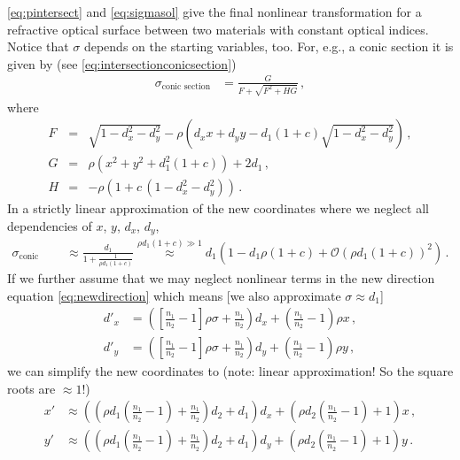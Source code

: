 \documentclass[12pt,a4paper,twoside,openright,BCOR10mm,headsepline,titlepage,abstracton,chapterprefix,final]{scrreprt}
\begin{document}
\eqref{eq:pintersect} and \eqref{eq:sigmasol} give the final nonlinear transformation for a refractive optical surface between
two materials with constant optical indices. Notice that $\sigma$ depends on the starting variables, too.  
For, e.g., a conic section it is given by (see \eqref{eq:intersectionconicsection})
\begin{align}
 \sigma_{\text{conic section}} &= \frac{G}{ F + \sqrt{F^2 + H G} }\,,
\end{align}
where
\begin{eqnarray}
   F &=& \sqrt{1 - d_x^2 - d_y^2} - \rho \left( d_x x + d_y y - d_1 (1+c) \sqrt{1 - d_x^2 - d_y^2} \right)\,, \\
   G &=& \rho (x^2 + y^2 + d_1^2 (1+c)) + 2 d_1\,, \\
   H &=& - \rho ( 1 + c \, (1 - d_x^2 - d_y^2) )\,.
\end{eqnarray}
In a strictly linear approximation of the new coordinates where we neglect all dependencies of $x$, $y$, $d_x$, $d_y$,
\begin{align}
 \sigma_\text{conic section} &\approx \frac{d_1}{1+ \frac{1}{\rho d_1 (1 + c)}} \stackrel{\rho d_1 (1+c)\gg 1}{\approx} d_1 \left(1 - d_1 \rho(1+c) + \mathcal{O}(\rho d_1 (1+c))^2\right)\,. 
\end{align}
If we further assume that we may neglect nonlinear terms in the new direction equation \eqref{eq:newdirection}
which means [we also approximate $\sigma \approx d_1$]\\
\begin{subequations}
 \begin{align}
  {d'}_x &= {\left(\left[\frac{n_{1}}{n_{2}} - 1\right]\rho \sigma + \frac{n_{1}}{n_{2}}\right)} d_{x} + {\left(\frac{n_{1}}{n_{2}} - 1\right)} \rho x\,,\\
  {d'}_y &= {\left(\left[\frac{n_{1}}{n_{2}} - 1\right]\rho \sigma + \frac{n_{1}}{n_{2}}\right)} d_{y} + {\left(\frac{n_{1}}{n_{2}} - 1\right)} \rho y\,,
 \end{align}
\end{subequations}
we can simplify the new coordinates to (note: linear approximation! So the square roots are $\approx1$!)
\begin{subequations}
\label{eq:linearapprox}
\begin{align}
 x' &\approx {\left({\left(\rho d_{1} \left(\frac{n_{1}}{n_{2}} - 1\right) + \frac{n_{1}}{n_{2}}\right)} d_{2} + d_{1}\right)} d_{x} + {\left(\rho d_{2} {\left(\frac{n_{1}}{n_{2}} - 1\right)} + 1\right)} x\,,\\
 y' &\approx {\left({\left(\rho d_{1} \left(\frac{n_{1}}{n_{2}} - 1\right) + \frac{n_{1}}{n_{2}}\right)} d_{2} + d_{1}\right)} d_{y} + {\left(\rho d_{2} {\left(\frac{n_{1}}{n_{2}} - 1\right)} + 1\right)} y\,.
\end{align}
\end{subequations}
\end{document}

